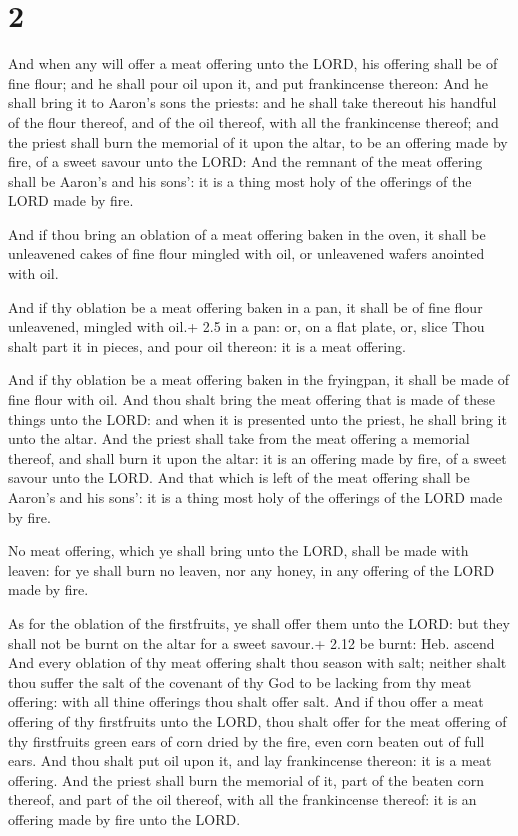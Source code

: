 \hypertarget{section-1}{%
\section{2}\label{section-1}}

 And when any will offer a meat offering unto the LORD, his
offering shall be of fine flour; and he shall pour oil upon it, and put
frankincense thereon:  And he shall bring it to Aaron's sons
the priests: and he shall take thereout his handful of the flour
thereof, and of the oil thereof, with all the frankincense thereof; and
the priest shall burn the memorial of it upon the altar, to be an
offering made by fire, of a sweet savour unto the LORD:  And
the remnant of the meat offering shall be Aaron's and his sons': it is a
thing most holy of the offerings of the LORD made by fire.

 And if thou bring an oblation of a meat offering baken in
the oven, it shall be unleavened cakes of fine flour mingled with oil,
or unleavened wafers anointed with oil.

 And if thy oblation be a meat offering baken in a pan, it
shall be of fine flour unleavened, mingled with oil.+ 2.5 in a pan: or,
on a flat plate, or, slice  Thou shalt part it in pieces,
and pour oil thereon: it is a meat offering.

 And if thy oblation be a meat offering baken in the
fryingpan, it shall be made of fine flour with oil.  And
thou shalt bring the meat offering that is made of these things unto the
LORD: and when it is presented unto the priest, he shall bring it unto
the altar.  And the priest shall take from the meat offering
a memorial thereof, and shall burn it upon the altar: it is an offering
made by fire, of a sweet savour unto the LORD.  And that
which is left of the meat offering shall be Aaron's and his sons': it is
a thing most holy of the offerings of the LORD made by fire.

 No meat offering, which ye shall bring unto the LORD,
shall be made with leaven: for ye shall burn no leaven, nor any honey,
in any offering of the LORD made by fire.

 As for the oblation of the firstfruits, ye shall offer
them unto the LORD: but they shall not be burnt on the altar for a sweet
savour.+ 2.12 be burnt: Heb. ascend  And every oblation of
thy meat offering shalt thou season with salt; neither shalt thou suffer
the salt of the covenant of thy God to be lacking from thy meat
offering: with all thine offerings thou shalt offer salt. 
And if thou offer a meat offering of thy firstfruits unto the LORD, thou
shalt offer for the meat offering of thy firstfruits green ears of corn
dried by the fire, even corn beaten out of full ears.  And
thou shalt put oil upon it, and lay frankincense thereon: it is a meat
offering.  And the priest shall burn the memorial of it,
part of the beaten corn thereof, and part of the oil thereof, with all
the frankincense thereof: it is an offering made by fire unto the LORD.

